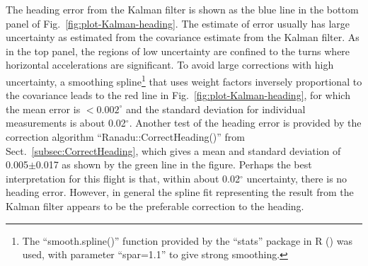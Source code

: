 \documentclass[12pt,twoside,english,12pt,twoside,english]{article}\usepackage[]{graphicx}\usepackage[]{color}
\let\OrgIndex\index
\renewcommand*{\index}[1]{\OrgIndex{#1}}
\begin{document}
The heading error
from the Kalman filter is shown
as the blue line in the bottom panel of Fig.~\ref{fig:plot-Kalman-heading}.
The estimate of error usually has large uncertainty as estimated from
the covariance estimate from the Kalman filter. As in the top panel,
the regions of low uncertainty are confined to the turns where horizontal
accelerations are significant. To avoid large corrections with high
uncertainty, a smoothing spline\footnote{The ``smooth.spline()'' function provided
by the ``stats'' package in R (\citet{Rlanguage})
was used, with parameter ``spar=1.1'' to give strong smoothing.} that uses weight factors inversely
proportional to the covariance leads to the red line in Fig.~\ref{fig:plot-Kalman-heading},
for which the mean error is $<0.002^{\circ}$
and the standard deviation
for individual measurements
is about 0.02$^{\circ}$. Another test of the heading error is provided
by the correction algorithm
``Ranadu::CorrectHeading()'' from Sect.~\ref{subsec:CorrectHeading},
which gives a mean and standard deviation of 0.005$\pm$0.017
as shown by the green line in the figure. Perhaps the best interpretation
for this flight is that, within about 0.02$^{\circ}$ uncertainty,
there is no heading error. However, in general the spline fit representing
the result from the Kalman filter appears to be the preferable correction
to the heading.
\end{document}
